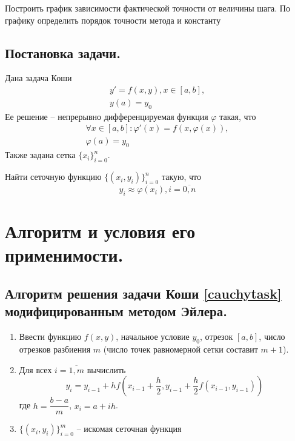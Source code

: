 \documentclass[a4paper, 12pt]{article}
\begin{document}
	Построить график зависимости фактической точности от величины шага. По графику определить порядок точности метода и константу
	
	\subsection{Постановка задачи.}
	
	Дана задача Коши
	\begin{equation} \label{cauchytask}
		\begin{gathered}
			y'=f(x,y), x\in[a,b],\\
			y(a)=y_0
		\end{gathered}
	\end{equation}
	Ее решение -- непрерывно дифференцируемая функция $\varphi$ такая, что
	\begin{equation}
		\begin{gathered}
			\forall x\in[a,b]: \varphi'(x)=f(x,\varphi(x)),\\ 
			\varphi(a)=y_0
		\end{gathered}
	\end{equation}
	Также задана сетка $\{x_i\}_{i=0}^n$.
	
	Найти сеточную функцию $\{(x_i,y_i)\}_{i=0}^n$ такую, что
	\begin{equation}
		y_i\approx\varphi(x_i), i=\overline{0,n}
	\end{equation}

	\section{Алгоритм и условия его применимости.}
	
	\subsection{Алгоритм решения задачи Коши \eqref{cauchytask} модифицированным методом Эйлера.}
	\label{alghorithm_simple}
	
	\begin{enumerate}
		\item Ввести функцию $f(x,y)$, начальное условие $y_0$, отрезок $[a,b]$, число отрезков разбиения $m$ (число точек равномерной сетки составит $m+1$).
		\item Для всех $i=\overline{1,m}$ вычислить
		\begin{equation} \label{method}
			y_i = y_{i-1} + hf(x_{i-1} + \frac{h}{2}, y_{i-1}+\frac{h}{2}f(x_{i-1},y_{i-1}))
		\end{equation}
		где $h=\dfrac{b-a}{m}$, $x_i=a+ih$.
		\item $\{(x_i,y_i)\}_{i=0}^m$ -- искомая сеточная функция
	\end{enumerate}
	
\end{document}
